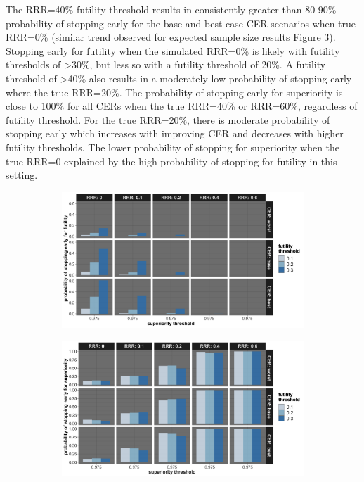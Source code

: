 \documentclass[]{article}
\begin{document}
The RRR=40\% futility threshold results in consistently greater than
80-90\% probability of stopping early for the base and best-case CER
scenarios when true RRR=0\% (similar trend observed for expected sample
size results Figure 3). Stopping early for futility when the simulated
RRR=0\% is likely with futility thresholds of \textgreater{}30\%, but
less so with a futility threshold of 20\%. A futility threshold of
\textgreater{}40\% also results in a moderately low probability of
stopping early where the true RRR=20\%. The probability of stopping
early for superiority is close to 100\% for all CERs when the true
RRR=40\% or RRR=60\%, regardless of futility threshold. For the true
RRR=20\%, there is moderate probability of stopping early which
increases with improving CER and decreases with higher futility
thresholds. The lower probability of stopping for superiority when the
true RRR=0 explained by the high probability of stopping for futility in
this setting.

\begin{figure}
\centering
  \caption{Probability of stopping early due to futility, and stopping early due to superiority. Stopping probabilities
  are presented for the three control event rates (CER – rows), relative risk reductions (RRR – columns), and futility thresholds (x-axis).}
  \label{fig:fig}
  \begin{subfigure}{0.8\textwidth}
    \centering
    \caption{}
    \includegraphics{../p1_plots/batch_size_nb_1000/prob_stop_early_fut_p1.png}
  \end{subfigure}
  \begin{subfigure}{0.8\textwidth}
    \centering
    \caption{}
    \includegraphics{../p1_plots/batch_size_nb_1000/prob_stop_early_sup_p1.png}
  \end{subfigure}
\end{figure}
\end{document}
